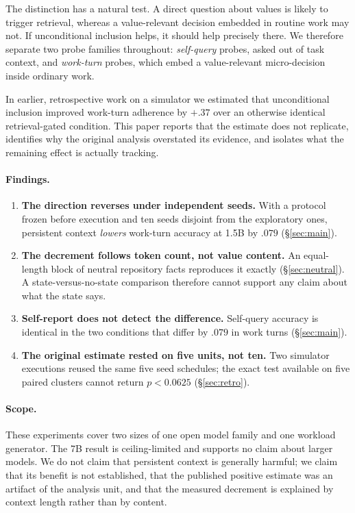 \documentclass[11pt]{article}
\begin{document}
The distinction has a natural test. A direct question about values is likely to trigger retrieval, whereas a value-relevant decision embedded in routine work may not. If unconditional inclusion helps, it should help precisely there. We therefore separate two probe families throughout: \emph{self-query} probes, asked out of task context, and \emph{work-turn} probes, which embed a value-relevant micro-decision inside ordinary work.

In earlier, retrospective work on a simulator we estimated that unconditional inclusion improved work-turn adherence by $+.37$ over an otherwise identical retrieval-gated condition. This paper reports that the estimate does not replicate, identifies why the original analysis overstated its evidence, and isolates what the remaining effect is actually tracking.

\paragraph{Findings.}
\begin{enumerate}
\item \textbf{The direction reverses under independent seeds.} With a protocol frozen before execution and ten seeds disjoint from the exploratory ones, persistent context \emph{lowers} work-turn accuracy at 1.5B by $.079$ (\S\ref{sec:main}).
\item \textbf{The decrement follows token count, not value content.} An equal-length block of neutral repository facts reproduces it exactly (\S\ref{sec:neutral}). A state-versus-no-state comparison therefore cannot support any claim about what the state says.
\item \textbf{Self-report does not detect the difference.} Self-query accuracy is identical in the two conditions that differ by $.079$ in work turns (\S\ref{sec:main}).
\item \textbf{The original estimate rested on five units, not ten.} Two simulator executions reused the same five seed schedules; the exact test available on five paired clusters cannot return $p<0.0625$ (\S\ref{sec:retro}).
\end{enumerate}

\paragraph{Scope.} These experiments cover two sizes of one open model family and one workload generator. The 7B result is ceiling-limited and supports no claim about larger models. We do not claim that persistent context is generally harmful; we claim that its benefit is not established, that the published positive estimate was an artifact of the analysis unit, and that the measured decrement is explained by context length rather than by content.
\end{document}
